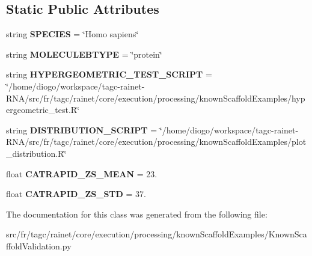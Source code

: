 \subsection*{Static Public Attributes}
\begin{DoxyCompactItemize}
\item 
\hypertarget{classKnownScaffoldValidation_1_1KnownScaffoldValidation_a4e4f98145aad840ab25a33b57f0cc1c3}{string {\bfseries S\-P\-E\-C\-I\-E\-S} = \char`\"{}Homo sapiens\char`\"{}}\label{classKnownScaffoldValidation_1_1KnownScaffoldValidation_a4e4f98145aad840ab25a33b57f0cc1c3}

\item 
\hypertarget{classKnownScaffoldValidation_1_1KnownScaffoldValidation_af0d8df4a1664ced28f9474a4645c50d6}{string {\bfseries M\-O\-L\-E\-C\-U\-L\-E\-B\-T\-Y\-P\-E} = \char`\"{}protein\char`\"{}}\label{classKnownScaffoldValidation_1_1KnownScaffoldValidation_af0d8df4a1664ced28f9474a4645c50d6}

\item 
\hypertarget{classKnownScaffoldValidation_1_1KnownScaffoldValidation_a53ea27a72aabd88609a9a57a5151373a}{string {\bfseries H\-Y\-P\-E\-R\-G\-E\-O\-M\-E\-T\-R\-I\-C\-\_\-\-T\-E\-S\-T\-\_\-\-S\-C\-R\-I\-P\-T} = \char`\"{}/home/diogo/workspace/tagc-\/rainet-\/R\-N\-A/src/fr/tagc/rainet/core/execution/processing/known\-Scaffold\-Examples/hypergeometric\-\_\-test.\-R\char`\"{}}\label{classKnownScaffoldValidation_1_1KnownScaffoldValidation_a53ea27a72aabd88609a9a57a5151373a}

\item 
\hypertarget{classKnownScaffoldValidation_1_1KnownScaffoldValidation_adbad4b16746163e28049d918f472a868}{string {\bfseries D\-I\-S\-T\-R\-I\-B\-U\-T\-I\-O\-N\-\_\-\-S\-C\-R\-I\-P\-T} = \char`\"{}/home/diogo/workspace/tagc-\/rainet-\/R\-N\-A/src/fr/tagc/rainet/core/execution/processing/known\-Scaffold\-Examples/plot\-\_\-distribution.\-R\char`\"{}}\label{classKnownScaffoldValidation_1_1KnownScaffoldValidation_adbad4b16746163e28049d918f472a868}

\item 
\hypertarget{classKnownScaffoldValidation_1_1KnownScaffoldValidation_a274e95bc24fff30e74160f4a74fefd75}{float {\bfseries C\-A\-T\-R\-A\-P\-I\-D\-\_\-\-Z\-S\-\_\-\-M\-E\-A\-N} = 23.}\label{classKnownScaffoldValidation_1_1KnownScaffoldValidation_a274e95bc24fff30e74160f4a74fefd75}

\item 
\hypertarget{classKnownScaffoldValidation_1_1KnownScaffoldValidation_a4ce49b584e20575cbfc223857c09f6b6}{float {\bfseries C\-A\-T\-R\-A\-P\-I\-D\-\_\-\-Z\-S\-\_\-\-S\-T\-D} = 37.}\label{classKnownScaffoldValidation_1_1KnownScaffoldValidation_a4ce49b584e20575cbfc223857c09f6b6}

\end{DoxyCompactItemize}


The documentation for this class was generated from the following file\-:\begin{DoxyCompactItemize}
\item 
src/fr/tagc/rainet/core/execution/processing/known\-Scaffold\-Examples/Known\-Scaffold\-Validation.\-py\end{DoxyCompactItemize}
